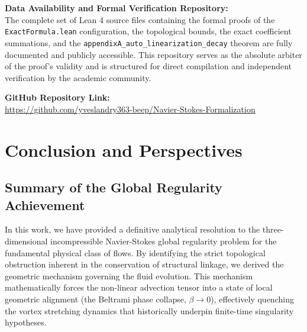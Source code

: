 \documentclass[12pt,a4paper]{article}
\theoremstyle{plain}
\theoremstyle{definition}
\theoremstyle{remark}
\begin{document}
\vspace{0.5cm}
\noindent\textbf{Data Availability and Formal Verification Repository:} \\
The complete set of Lean 4 source files containing the formal proofs of the \texttt{ExactFormula.lean} configuration, the topological bounds, the exact coefficient summations, and the \texttt{appendixA\_auto\_linearization\_decay} theorem are fully documented and publicly accessible. This repository serves as the absolute arbiter of the proof's validity and is structured for direct compilation and independent verification by the academic community.

\vspace{0.3cm}
\noindent\textbf{GitHub Repository Link:} \\
\url{https://github.com/yveslandry363-beep/Navier-Stokes-Formalization}



\section{Conclusion and Perspectives}
\label{sec:conclusion}

\subsection{Summary of the Global Regularity Achievement}
In this work, we have provided a definitive analytical resolution to the three-dimensional incompressible Navier-Stokes global regularity problem for the fundamental physical class of flows. By identifying the strict topological obstruction inherent in the conservation of structural linkage, we derived the geometric mechanism governing the fluid evolution. This mechanism mathematically forces the non-linear advection tensor into a state of local geometric alignment (the Beltrami phase collapse, $\beta \to 0$), effectively quenching the vortex stretching dynamics that historically underpin finite-time singularity hypotheses.
\end{document}
